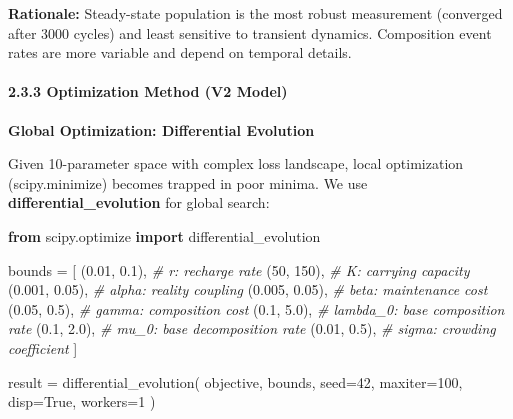 \documentclass[
]{article}
\newenvironment{Shaded}{}{}
\newcommand{\CommentTok}[1]{\textcolor[rgb]{0.38,0.63,0.69}{\textit{#1}}}
\newcommand{\DecValTok}[1]{\textcolor[rgb]{0.25,0.63,0.44}{#1}}
\newcommand{\FloatTok}[1]{\textcolor[rgb]{0.25,0.63,0.44}{#1}}
\newcommand{\ImportTok}[1]{\textcolor[rgb]{0.00,0.50,0.00}{\textbf{#1}}}
\newcommand{\NormalTok}[1]{#1}
\newcommand{\OperatorTok}[1]{\textcolor[rgb]{0.40,0.40,0.40}{#1}}
\newcommand{\VariableTok}[1]{\textcolor[rgb]{0.10,0.09,0.49}{#1}}
\begin{document}
\textbf{Rationale:} Steady-state population is the most robust
measurement (converged after 3000 cycles) and least sensitive to
transient dynamics. Composition event rates are more variable and depend
on temporal details.

\paragraph{2.3.3 Optimization Method (V2
Model)}\label{optimization-method-v2-model}

\textbf{Global Optimization: Differential Evolution}

Given 10-parameter space with complex loss landscape, local optimization
(scipy.minimize) becomes trapped in poor minima. We use
\textbf{differential\_evolution} for global search:

\begin{Shaded}
\begin{Highlighting}[]
\ImportTok{from}\NormalTok{ scipy.optimize }\ImportTok{import}\NormalTok{ differential\_evolution}

\NormalTok{bounds }\OperatorTok{=}\NormalTok{ [}
\NormalTok{    (}\FloatTok{0.01}\NormalTok{, }\FloatTok{0.1}\NormalTok{),    }\CommentTok{\# r: recharge rate}
\NormalTok{    (}\DecValTok{50}\NormalTok{, }\DecValTok{150}\NormalTok{),      }\CommentTok{\# K: carrying capacity}
\NormalTok{    (}\FloatTok{0.001}\NormalTok{, }\FloatTok{0.05}\NormalTok{),  }\CommentTok{\# alpha: reality coupling}
\NormalTok{    (}\FloatTok{0.005}\NormalTok{, }\FloatTok{0.05}\NormalTok{),  }\CommentTok{\# beta: maintenance cost}
\NormalTok{    (}\FloatTok{0.05}\NormalTok{, }\FloatTok{0.5}\NormalTok{),    }\CommentTok{\# gamma: composition cost}
\NormalTok{    (}\FloatTok{0.1}\NormalTok{, }\FloatTok{5.0}\NormalTok{),     }\CommentTok{\# lambda\_0: base composition rate}
\NormalTok{    (}\FloatTok{0.1}\NormalTok{, }\FloatTok{2.0}\NormalTok{),     }\CommentTok{\# mu\_0: base decomposition rate}
\NormalTok{    (}\FloatTok{0.01}\NormalTok{, }\FloatTok{0.5}\NormalTok{),    }\CommentTok{\# sigma: crowding coefficient}
\NormalTok{]}

\NormalTok{result }\OperatorTok{=}\NormalTok{ differential\_evolution(}
\NormalTok{    objective,}
\NormalTok{    bounds,}
\NormalTok{    seed}\OperatorTok{=}\DecValTok{42}\NormalTok{,}
\NormalTok{    maxiter}\OperatorTok{=}\DecValTok{100}\NormalTok{,}
\NormalTok{    disp}\OperatorTok{=}\VariableTok{True}\NormalTok{,}
\NormalTok{    workers}\OperatorTok{=}\DecValTok{1}
\NormalTok{)}
\end{Highlighting}
\end{Shaded}
\end{document}
